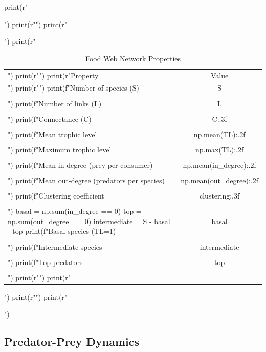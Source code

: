 \documentclass[a4paper, 11pt]{article}
\begin{document}
\begin{pycode}
print(r"\begin{table}[htbp]")
print(r"\centering")
print(r"\caption{Food Web Network Properties}")
print(r"\begin{tabular}{lc}")
print(r"\toprule")
print(r"Property & Value \\")
print(r"\midrule")
print(f"Number of species (S) & {S} \\\\")
print(f"Number of links (L) & {L} \\\\")
print(f"Connectance (C) & {C:.3f} \\\\")
print(f"Mean trophic level & {np.mean(TL):.2f} \\\\")
print(f"Maximum trophic level & {np.max(TL):.2f} \\\\")
print(f"Mean in-degree (prey per consumer) & {np.mean(in_degree):.2f} \\\\")
print(f"Mean out-degree (predators per species) & {np.mean(out_degree):.2f} \\\\")
print(f"Clustering coefficient & {clustering:.3f} \\\\")
basal = np.sum(in_degree == 0)
top = np.sum(out_degree == 0)
intermediate = S - basal - top
print(f"Basal species (TL=1) & {basal} \\\\")
print(f"Intermediate species & {intermediate} \\\\")
print(f"Top predators & {top} \\\\")
print(r"\bottomrule")
print(r"\end{tabular}")
print(r"\label{tab:network}")
print(r"\end{table}")
\end{pycode}

\subsection{Predator-Prey Dynamics}
\end{document}
